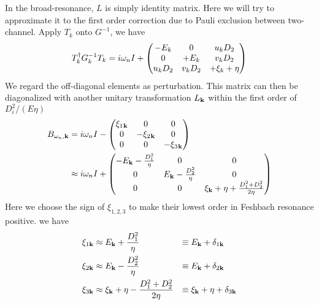 In the broad-resonance, $L$ is simply identity matrix.  Here we will try to approximate it to the first order correction due to Pauli exclusion between two-channel.  
Apply $T_k$ onto $G^{-1}$, we have 
\begin{equation}\label{eq:pathInt2:G2}
T_k^{\dagger}G_k^{-1}T_k=i\omega_nI+\begin{pmatrix}-E_k&0&u_kD_2\\0&+E_k&v_kD_2\\u_kD_2&v_kD_2&+\xi_k+\eta\end{pmatrix}
\end{equation}
We regard the off-diagonal elements as perturbation.  This matrix can then be diagonalized with another unitary transformation $L_{\mathbf{k}}$ within the first order of $D_{i}^{2}/(E\eta)$
\begin{equation}
\begin{split}
B_{\omega_{n},\mathbf{k}}&=i\omega_{n}I-
	\begin{pmatrix}\xi_{1}{}_{\mathbf{k}}&0&0\\0&-\xi_{2}{}_{\mathbf{k}}&0\\0&0&-\xi_{3}{}_{\mathbf{k}}\end{pmatrix}\\
	&\approx{}i\omega_{n}I+
	\begin{pmatrix}-E_{\mathbf{k}}-\frac{D_{1}^{2}}{\eta}&0&0\\
	0&E_{\mathbf{k}}-\frac{D_{2}^{2}}{\eta}&0\\0&0&\xi_{\mathbf{k}}+\eta+\frac{D_{1}^{2}+D_{2}^{2}}{2\eta}\end{pmatrix}
\end{split}	
\end{equation}
Here we choose the sign of $\xi_{1,2,3}$  to make their lowest order in Feshbach resonance positive.  
we have 
\begin{align}
\xi_{1\mathbf{k}}&\approx{}E_{\mathbf{k}}+\frac{D_{1}^{2}}{\eta}&\equiv{}&E_{\mathbf{k}}+\delta_{1\mathbf{k}}\\
\xi_{2\mathbf{k}}&\approx{}E_{\mathbf{k}}-\frac{D_{2}^{2}}{\eta}&\equiv{}&E_{\mathbf{k}}+\delta_{2\mathbf{k}}\\
\xi_{3\mathbf{k}}&\approx{}\xi_{\mathbf{k}}+\eta-\frac{D_{1}^{2}+D_{2}^{2}}{2\eta}&\equiv{}&\xi_{\mathbf{k}}+\eta+\delta_{3\mathbf{k}}
\end{align}

